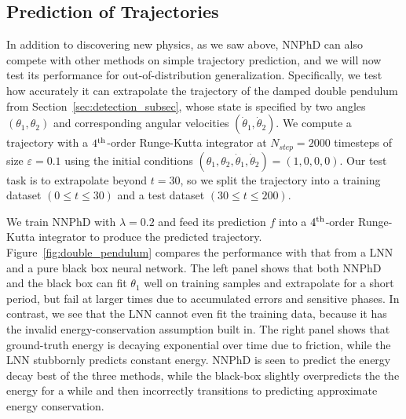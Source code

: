 \documentclass[aps,pre,reprint,superscriptaddress,nofootinbib,amsmath,amssymb]{revtex4-2}
\begin{document}
\subsection{Prediction of Trajectories}\label{sec:prediction_exp}

In addition to discovering new physics, as we saw above, 
NNPhD can also compete with other methods on simple trajectory prediction,
and we will now test its performance for out-of-distribution generalization.
Specifically, we test how accurately it can extrapolate the trajectory
of the damped double pendulum from Section~\ref{sec:detection_subsec}, whose state is specified by two angles $(\theta_1,\theta_2)$ and corresponding angular velocities $(\dot{\theta}_1,\dot{\theta}_2)$. We compute a trajectory with a $4^{\rm th}$-order Runge-Kutta integrator at $N_{step}=2000$ timesteps of size $\varepsilon=0.1$ using the initial conditions $(\theta_1,\theta_2,\dot{\theta}_1, \dot{\theta}_2)=(1,0,0,0)$. Our test task is to extrapolate beyond $t=30$, so we split the trajectory into a training dataset $(0\leq t\leq 30)$ and a test dataset $(30\leq t\leq 200)$.

We train NNPhD with $\lambda=0.2$ and feed its prediction $f$ into a $4^{\rm th}$-order Runge-Kutta integrator to produce the predicted trajectory. 
Figure~\ref{fig:double_pendulum} compares the performance with that from
a LNN and a pure black box neural network.
The left panel shows that both NNPhD and the black box can fit $\theta_1$ well on training samples and extrapolate for a short period, but fail at larger times due to accumulated errors and sensitive phases. In contrast, we see that the LNN cannot even fit the training data,
because it has the invalid energy-conservation assumption built in.
The right panel shows that ground-truth energy is decaying exponential over time due to friction, while the LNN stubbornly predicts constant energy. 
NNPhD is seen to predict the energy decay best of the three methods, while the black-box slightly overpredicts  the 
the energy for a while and then incorrectly transitions to predicting approximate energy conservation.




 
\end{document}
